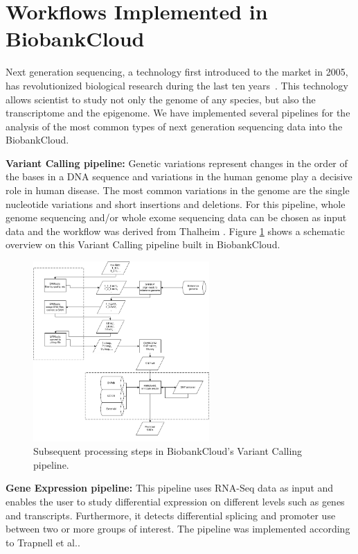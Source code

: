 \section{Workflows Implemented in BiobankCloud}
Next generation sequencing, a technology first introduced to the market in 2005, has revolutionized biological research during the last ten years~\cite{shendure2008next}. This technology allows scientist to study not only the genome of any species, but also the transcriptome and the epigenome.
We have implemented several pipelines for the analysis of the most common types of next generation sequencing data into the BiobankCloud. 

\textbf{Variant Calling pipeline:} Genetic variations represent changes in the order of the bases in a DNA sequence and variations in the human genome play a decisive role in human disease. The most common variations in the genome are the single nucleotide variations and short insertions and deletions. For this pipeline, whole genome sequencing and/or whole exome sequencing data can be chosen as input data and the workflow was derived from Thalheim \cite{snp_wf_thalheim}. Figure \ref{fig:workflow_snp} shows a schematic overview on this Variant Calling pipeline built in BiobankCloud.


\vskip-5pt
\begin{figure}[h]
\centering
\includegraphics[width=0.6\textwidth]{./imgs/wf_snp.png}
\caption{Subsequent processing steps in BiobankCloud's Variant Calling pipeline.}
\label{fig:workflow_snp}
\end{figure}
\vskip-5pt


\textbf{Gene Expression pipeline:} This pipeline uses RNA-Seq data as input and enables the user to study differential expression on different levels such as 
genes and transcripts. Furthermore, it detects differential splicing and promoter use between two or more groups of interest.
The pipeline was implemented according to Trapnell et al.\cite{trapnell2012differential, trapnell2013differential}.

